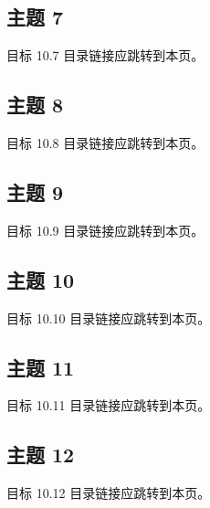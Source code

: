 \documentclass[navigation=false]{campusbeamer}
\begin{document}
\subsection{主题 7}
\begin{frame}{目标 10.7}
目录链接应跳转到本页。
\end{frame}
\subsection{主题 8}
\begin{frame}{目标 10.8}
目录链接应跳转到本页。
\end{frame}
\subsection{主题 9}
\begin{frame}{目标 10.9}
目录链接应跳转到本页。
\end{frame}
\subsection{主题 10}
\begin{frame}{目标 10.10}
目录链接应跳转到本页。
\end{frame}
\subsection{主题 11}
\begin{frame}{目标 10.11}
目录链接应跳转到本页。
\end{frame}
\subsection{主题 12}
\begin{frame}{目标 10.12}
目录链接应跳转到本页。
\end{frame}
\end{document}
